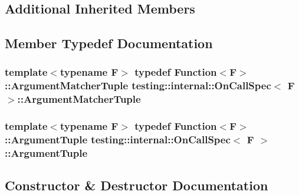 \subsection*{Additional Inherited Members}


\subsection{Member Typedef Documentation}
\subsubsection[{\texorpdfstring{Argument\+Matcher\+Tuple}{ArgumentMatcherTuple}}]{\setlength{\rightskip}{0pt plus 5cm}template$<$typename F$>$ typedef {\bf Function}$<$F$>$\+::{\bf Argument\+Matcher\+Tuple} {\bf testing\+::internal\+::\+On\+Call\+Spec}$<$ F $>$\+::{\bf Argument\+Matcher\+Tuple}}\hypertarget{classtesting_1_1internal_1_1_on_call_spec_a3240f159f0a9d8cda208bc256da35074}{}\label{classtesting_1_1internal_1_1_on_call_spec_a3240f159f0a9d8cda208bc256da35074}
\subsubsection[{\texorpdfstring{Argument\+Tuple}{ArgumentTuple}}]{\setlength{\rightskip}{0pt plus 5cm}template$<$typename F$>$ typedef {\bf Function}$<$F$>$\+::{\bf Argument\+Tuple} {\bf testing\+::internal\+::\+On\+Call\+Spec}$<$ F $>$\+::{\bf Argument\+Tuple}}\hypertarget{classtesting_1_1internal_1_1_on_call_spec_a70ffab8b915b7b48a90f5ce256da806f}{}\label{classtesting_1_1internal_1_1_on_call_spec_a70ffab8b915b7b48a90f5ce256da806f}


\subsection{Constructor \& Destructor Documentation}
